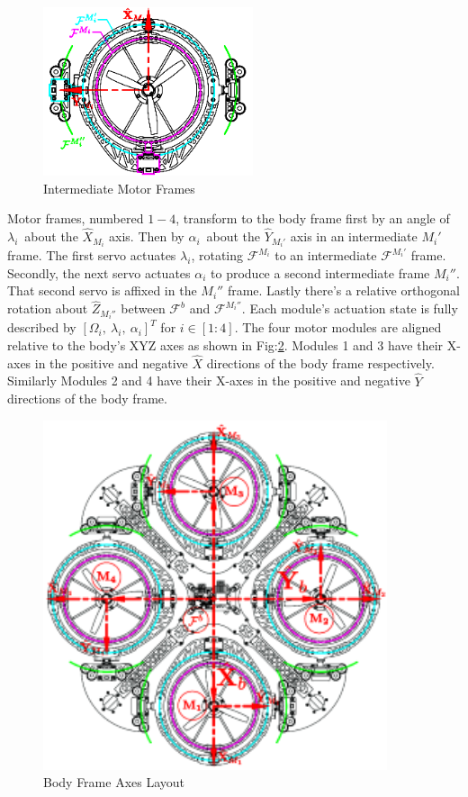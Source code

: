 \begin{minipage}{\textwidth}
\begin{figure}
\centering
\includegraphics[width=0.55\textwidth]{figs/motor-frame}
\caption{Intermediate Motor Frames}
\label{fig:motor-frame}
\end{figure}
Motor frames, numbered $1-4$, transform to the body frame first by an angle of $\lambda_i$\textdegree ~about the $\hat{X}_{M_i}$ axis. Then by $\alpha_i$\textdegree ~about the $\hat{Y}_{M_i'}$ axis in an intermediate $M_i'$ frame. The first servo actuates $\lambda_i$, rotating $\mathcal{F}^{M_i}$ to an intermediate $\mathcal{F}^{M_i'}$ frame. Secondly, the next servo actuates $\alpha_i$ to produce a second intermediate frame $M_i''$. That second servo is affixed in the $M_i''$ frame. Lastly there's a relative orthogonal rotation about $\hat{Z}_{M_i''}$ between $\mathcal{F}^b$ and $\mathcal{F}^{M_i''}$. Each module's actuation state is fully described by $[\Omega_{i},~\lambda_{i},~\alpha_{i}]^{T}$ for $i\in [1:4]$. The four motor modules are aligned relative to the body's XYZ axes as shown in Fig:\ref{fig:body-frame}. Modules 1 and 3 have their X-axes in the positive and negative $\hat{X}$ directions of the body frame respectively. Similarly Modules 2 and 4 have their X-axes in the positive and negative $\hat{Y}$ directions of the body frame.
\end{minipage}
\newpage
\begin{figure}[htbp]
\centering
\includegraphics[width=0.9\textwidth]{figs/body-frame}
\caption{Body Frame Axes Layout}
\label{fig:body-frame}
\end{figure}
